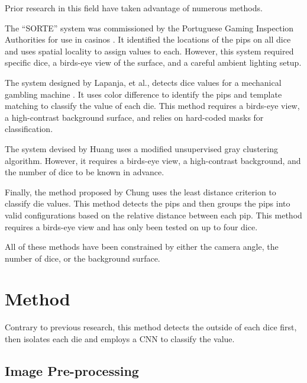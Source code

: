 \documentclass[conference]{IEEEtran}
\begin{document}
Prior research in this field have taken advantage of numerous methods.

The ``SORTE'' system was commissioned by the Portuguese Gaming Inspection Authorities for use in casinos \cite{Correia1995}.
It identified the locations of the pips on all dice and uses spatial locality to assign values to each.
However, this system required specific dice, a birds-eye view of the surface, and a careful ambient lighting setup.

The system designed by Lapanja, et al., detects dice values for a mechanical gambling machine \cite{Lapanjaa}.
It uses color difference to identify the pips and template matching to classify the value of each die.
This method requires a birds-eye view, a high-contrast background surface, and relies on hard-coded masks for classification.

The system devised by Huang \cite{Huang2008} uses a modified unsupervised gray clustering algorithm. 
However, it requires a birds-eye view, a high-contrast background, and the number of dice to be known in advance.

Finally, the method proposed by Chung \cite{Chung2009} uses the least distance criterion to classify die values.
This method detects the pips and then groups the pips into valid configurations based on the relative distance between each pip.
This method requires a birds-eye view and has only been tested on up to four dice.

All of these methods have been constrained by either the camera angle, the number of dice, or the background surface.

\section{Method}

Contrary to previous research, this method detects the outside of each dice first, then isolates each die and employs a CNN to classify the value.

\subsection{Image Pre-processing}
\end{document}
